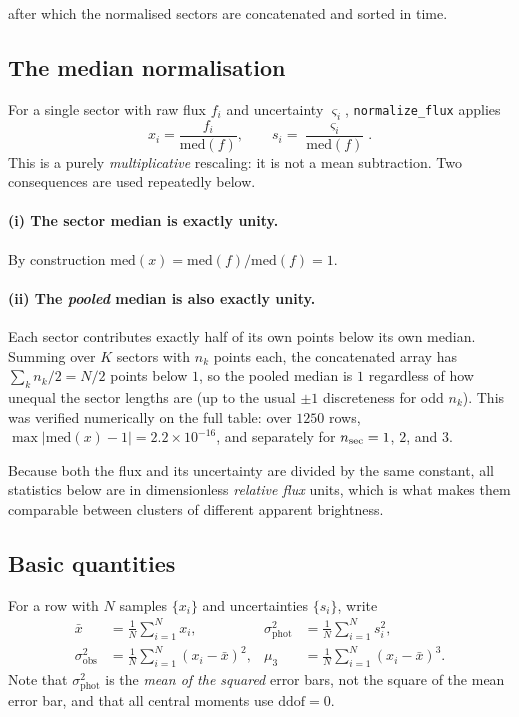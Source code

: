 \documentclass[11pt]{article}
\newcommand{\sigobs}{\sigma_{\mathrm{obs}}}
\newcommand{\sigphot}{\sigma_{\mathrm{phot}}}
\begin{document}
after which the normalised sectors are concatenated and sorted in time.

\subsection{The median normalisation}

For a single sector with raw flux $f_i$ and uncertainty $\varsigma_i$,
\texttt{normalize\_flux} applies
%
\begin{equation}
  x_i = \frac{f_i}{\mathrm{med}(f)}, \qquad
  s_i = \frac{\varsigma_i}{\mathrm{med}(f)} .
  \label{eq:norm}
\end{equation}
%
This is a purely \emph{multiplicative} rescaling: it is not a mean subtraction.
Two consequences are used repeatedly below.

\paragraph{(i) The sector median is exactly unity.}
By construction $\mathrm{med}(x) = \mathrm{med}(f)/\mathrm{med}(f) = 1$.

\paragraph{(ii) The \emph{pooled} median is also exactly unity.}
Each sector contributes exactly half of its own points below its own median.
Summing over $K$ sectors with $n_k$ points each, the concatenated array has
$\sum_k n_k/2 = N/2$ points below $1$, so the pooled median is $1$ regardless of
how unequal the sector lengths are (up to the usual $\pm 1$ discreteness for odd
$n_k$). This was verified numerically on the full table: over $1250$ rows,
$\max|\mathrm{med}(x) - 1| = 2.2\times10^{-16}$, and separately for
$n_{\rm sec} = 1$, $2$, and $3$.

Because both the flux and its uncertainty are divided by the same constant, all
statistics below are in dimensionless \emph{relative flux} units, which is what
makes them comparable between clusters of different apparent brightness.

\subsection{Basic quantities}

For a row with $N$ samples $\{x_i\}$ and uncertainties $\{s_i\}$, write
%
\begin{align}
  \bar{x}       &= \frac{1}{N}\sum_{i=1}^{N} x_i,
  &
  \sigphot^{2}  &= \frac{1}{N}\sum_{i=1}^{N} s_i^{2},
  \label{eq:basic1}\\[4pt]
  \sigobs^{2}   &= \frac{1}{N}\sum_{i=1}^{N}\left(x_i - \bar{x}\right)^{2},
  &
  \mu_3         &= \frac{1}{N}\sum_{i=1}^{N}\left(x_i - \bar{x}\right)^{3}.
  \label{eq:basic2}
\end{align}
%
Note that $\sigphot^2$ is the \emph{mean of the squared} error bars, not the
square of the mean error bar, and that all central moments use $\mathrm{ddof}=0$.
\end{document}
